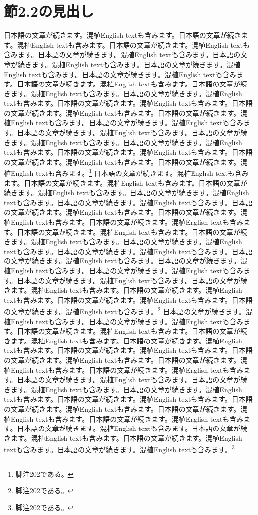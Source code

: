 \documentclass[pdflatex,book]{jlreq}
\begin{document}
\section{節2.2の見出し}
日本語の文章が続きます。混植English textも含みます。日本語の文章が続きます。混植English textも含みます。日本語の文章が続きます。混植English textも含みます。日本語の文章が続きます。混植English textも含みます。日本語の文章が続きます。混植English textも含みます。日本語の文章が続きます。混植English textも含みます。日本語の文章が続きます。混植English textも含みます。日本語の文章が続きます。混植English textも含みます。日本語の文章が続きます。混植English textも含みます。日本語の文章が続きます。混植English textも含みます。日本語の文章が続きます。混植English textも含みます。日本語の文章が続きます。混植English textも含みます。日本語の文章が続きます。混植English textも含みます。日本語の文章が続きます。混植English textも含みます。日本語の文章が続きます。混植English textも含みます。日本語の文章が続きます。混植English textも含みます。日本語の文章が続きます。混植English textも含みます。日本語の文章が続きます。混植English textも含みます。日本語の文章が続きます。混植English textも含みます。日本語の文章が続きます。混植English textも含みます。\footnote{脚注202である。}
日本語の文章が続きます。混植English textも含みます。日本語の文章が続きます。混植English textも含みます。日本語の文章が続きます。混植English textも含みます。日本語の文章が続きます。混植English textも含みます。日本語の文章が続きます。混植English textも含みます。日本語の文章が続きます。混植English textも含みます。日本語の文章が続きます。混植English textも含みます。日本語の文章が続きます。混植English textも含みます。日本語の文章が続きます。混植English textも含みます。日本語の文章が続きます。混植English textも含みます。日本語の文章が続きます。混植English textも含みます。日本語の文章が続きます。混植English textも含みます。日本語の文章が続きます。混植English textも含みます。日本語の文章が続きます。混植English textも含みます。日本語の文章が続きます。混植English textも含みます。日本語の文章が続きます。混植English textも含みます。日本語の文章が続きます。混植English textも含みます。日本語の文章が続きます。混植English textも含みます。日本語の文章が続きます。混植English textも含みます。日本語の文章が続きます。混植English textも含みます。\footnote{脚注202である。}
日本語の文章が続きます。混植English textも含みます。日本語の文章が続きます。混植English textも含みます。日本語の文章が続きます。混植English textも含みます。日本語の文章が続きます。混植English textも含みます。日本語の文章が続きます。混植English textも含みます。日本語の文章が続きます。混植English textも含みます。日本語の文章が続きます。混植English textも含みます。日本語の文章が続きます。混植English textも含みます。日本語の文章が続きます。混植English textも含みます。日本語の文章が続きます。混植English textも含みます。日本語の文章が続きます。混植English textも含みます。日本語の文章が続きます。混植English textも含みます。日本語の文章が続きます。混植English textも含みます。日本語の文章が続きます。混植English textも含みます。日本語の文章が続きます。混植English textも含みます。日本語の文章が続きます。混植English textも含みます。日本語の文章が続きます。混植English textも含みます。日本語の文章が続きます。混植English textも含みます。日本語の文章が続きます。混植English textも含みます。日本語の文章が続きます。混植English textも含みます。\footnote{脚注202である。}
\end{document}
